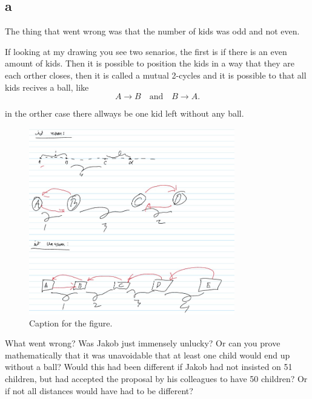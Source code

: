 \documentclass{article}
\begin{document}
\subsection{a}

The thing that went wrong was that the number of kids was odd and not even. 


If looking at my drawing you see two senarios, the first is if there is an even amount of kids. Then it is possible to position the kids in a way that they are each orther closes, then it is called a mutual 2-cycles and it is possible to that all kids recives a ball, like 
\[
A \to B \quad \text{and} \quad B \to A.
\]

in the orther case there allways be one kid left without any ball.


\begin{figure}[h!]
    \centering
    \includegraphics[width=0.8\textwidth]{Figures/figure_1.jpg}
    \caption{Caption for the figure.}
    \label{fig:myfigure}
\end{figure}





What went wrong? Was Jakob just immensely unlucky? Or can you prove mathematically
that it was unavoidable that at least one child would end up without a ball? Would this
had been different if Jakob had not insisted on 51 children, but had accepted the proposal
by his colleagues to have 50 children? Or if not all distances would have had to be different?
\end{document}
